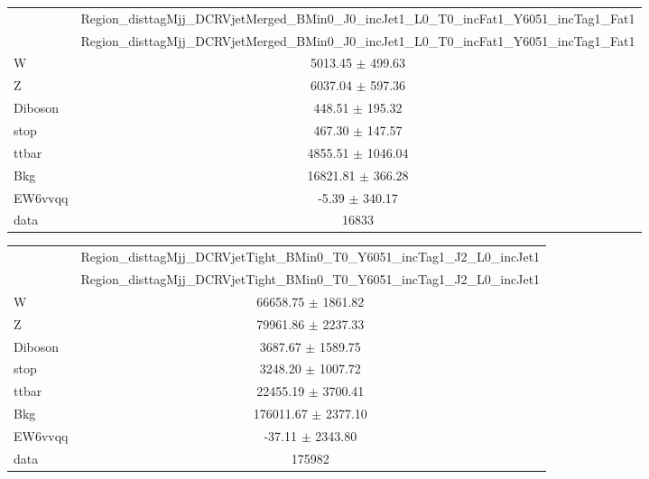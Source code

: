 \documentclass{article}
\begin{document}
\begin{table}
\centering
\small
\begin{tabular}{l|c|}
\cline{2-2}
 & \multicolumn{1}{c|}{Region\_disttagMjj\_DCRVjetMerged\_BMin0\_J0\_incJet1\_L0\_T0\_incFat1\_Y6051\_incTag1\_Fat1}\\
\cline{2-2}
 & \multicolumn{1}{c|}{Region\_disttagMjj\_DCRVjetMerged\_BMin0\_J0\_incJet1\_L0\_T0\_incFat1\_Y6051\_incTag1\_Fat1}\\ \hline
W & 5013.45 $\pm$ 499.63\\
Z & 6037.04 $\pm$ 597.36\\
Diboson & 448.51 $\pm$ 195.32\\
stop & 467.30 $\pm$ 147.57\\
ttbar & 4855.51 $\pm$ 1046.04\\
\hline
Bkg & 16821.81 $\pm$ 366.28\\
\hline
EW6vvqq & -5.39 $\pm$ 340.17\\
\hline
data & 16833\\ \hline
\end{tabular}
\end{table}


\begin{table}
\centering
\small
\begin{tabular}{l|c|}
\cline{2-2}
 & \multicolumn{1}{c|}{Region\_disttagMjj\_DCRVjetTight\_BMin0\_T0\_Y6051\_incTag1\_J2\_L0\_incJet1}\\
\cline{2-2}
 & \multicolumn{1}{c|}{Region\_disttagMjj\_DCRVjetTight\_BMin0\_T0\_Y6051\_incTag1\_J2\_L0\_incJet1}\\ \hline
W & 66658.75 $\pm$ 1861.82\\
Z & 79961.86 $\pm$ 2237.33\\
Diboson & 3687.67 $\pm$ 1589.75\\
stop & 3248.20 $\pm$ 1007.72\\
ttbar & 22455.19 $\pm$ 3700.41\\
\hline
Bkg & 176011.67 $\pm$ 2377.10\\
\hline
EW6vvqq & -37.11 $\pm$ 2343.80\\
\hline
data & 175982\\ \hline
\end{tabular}
\end{table}


\clearpage
\end{document}
